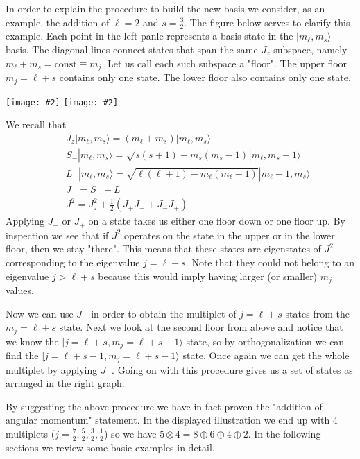 \documentclass[onecolumn,fleqn]{revtex4}
\newcommand{\const}{\mathrm{const}}
\newcommand{\putgraph}[2][0.30\hsize]{\texttt{[image: \#2]}}
\newcommand{\beq}{\begin{eqnarray}}
\newcommand{\eeq}{\end{eqnarray}}
\begin{document}
In order to explain the procedure to build the new basis 
we consider, as an example, the addition of $\ell=2$ and 
$s=\frac{3}{2}$. The figure below serves to clarify 
this example. Each point in the left panle represents a basis
state in the $|m_{\ell},m_s\rangle$ basis. 
The diagonal lines connect states that span the same $J_z$ subspace, 
namely ${m_{\ell}+m_s=\const \equiv m_j}$. 
Let us call each such subspace a "floor". The upper floor 
$m_j=\ell+s$ contains only one state. The lower floor 
also contains only one state.

\begin{center}
\putgraph[0.45\hsize]{AngularMomentuml2s32msmlGraph}
\hspace*{0.08\hsize}
\putgraph[0.35\hsize]{AngularMomentuml2s32jmjGraph}
\end{center}

We recall that 
\beq
&& J_z|m_{\ell},m_s\rangle = (m_{\ell}+m_s) |m_{\ell},m_s\rangle \\
&& S_{-}|m_{\ell},m_s\rangle = \sqrt{s(s+1)-m_s(m_s-1)} |m_{\ell},m_s-1\rangle \\
&& L_{-}|m_{\ell},m_s\rangle = \sqrt{\ell(\ell+1)-m_{\ell}(m_{\ell}-1)} |m_{\ell}-1,m_s\rangle \\ 
&& J_{-} = S_{-} + L_{-} \\
&& J^{2} = J_{z}^{2} + \frac{1}{2} (J_{+}J_{-}+J_{-}J_{+}) 
\eeq
Applying  $J_{-}$ or $J_{+}$ on a state takes us either 
one floor down or one floor up.
By inspection we see that if $J^2$ operates on the state 
in the upper or in the lower floor, then we stay "there". 
This means that these states are eigenstates of $J^2$ 
corresponding to the eigenvalue $j=\ell+s$. Note that 
they could not belong to an eigenvalue $j>\ell+s$ 
because this would imply having larger (or smaller) $m_j$ values.

Now we can use $J_{-}$ in order to obtain the multiplet 
of $j=\ell+s$ states from the $m_{j}=\ell+s$ state. 
Next we look at the second 
floor from above and notice that we know 
the $|j=\ell+s,m_j=\ell+s-1\rangle$ state, 
so by orthogonalization we can find the 
$|j=\ell+s-1,m_j=\ell+s-1\rangle$ state. 
Once again we can get the whole multiplet 
by applying $J_{-}$. Going on with this procedure 
gives us a set of states as arranged in the 
right graph. 

By suggesting the above procedure we have in fact proven  
the "addition of angular momentum" statement.
In the displayed illustration we end up with 4 multiplets 
($j=\frac{7}2,\frac{5}2,\frac{3}2,\frac{1}2$) 
so we have $5\otimes4=8\oplus6\oplus4\oplus2$. 
In the following sections we review some basic examples in detail. 
\end{document}
